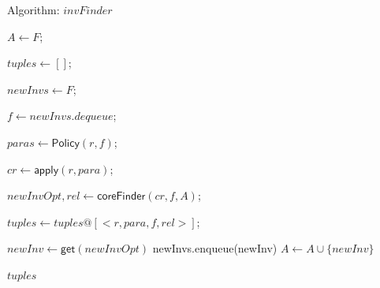 \documentclass[final]{IEEEtran}
\newcommand\lyj[1]{\textcolor{magenta}{lyj: #1}}
\begin{document}
\begin{algorithm}

\caption{Algorithm: $invFinder$\label{alg:invfinder}}



{
    $A\leftarrow F$;

    $tuples \leftarrow []$;

    $newInvs \leftarrow F$;

    {
   $ f \leftarrow newInvs.dequeue$;

   { $paras \leftarrow \mathsf{Policy}(r,f)$;

     {$cr \leftarrow \mathsf{apply}(r,para)$;

       $newInvOpt,rel \leftarrow \mathsf{coreFinder}(cr,  f, A)$;

        $tuples \leftarrow tuples @[<r, para, f, rel>]$;

        {$newInv \leftarrow \mathsf{get}(newInvOpt)$\;
         newInvs.enqueue(newInv)\;
        $A \leftarrow A \cup \{newInv\}$\;
        }

     }
   }
  }
\Return $tuples$\;
}


\end{algorithm}



\end{document}
